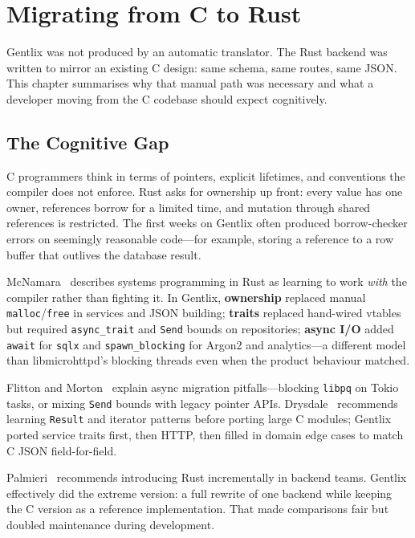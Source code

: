 \chapter{Migrating from C to Rust}
\label{chap:ch7}

\par Gentlix was not produced by an automatic translator. The Rust backend was written 
to mirror an existing C design: same schema, same routes, same JSON. This chapter 
summarises why that manual path was necessary and what a developer moving from the C 
codebase should expect cognitively.

\section{The Cognitive Gap}
\label{sec:ch7sec1}

\par C programmers think in terms of pointers, explicit lifetimes, and conventions 
the compiler does not enforce. Rust asks for ownership up front: every value has one 
owner, references borrow for a limited time, and mutation through shared references 
is restricted. The first weeks on Gentlix often produced borrow-checker errors on 
seemingly reasonable code---for example, storing a reference to a row buffer that 
outlives the database result.

\par McNamara~\cite{McNamara2021} describes systems programming in Rust as learning to 
work \emph{with} the compiler rather than fighting it. In Gentlix, \textbf{ownership} 
replaced manual \texttt{malloc}/\texttt{free} in services and JSON building; 
\textbf{traits} replaced hand-wired vtables but required \texttt{async\_trait} and 
\texttt{Send} bounds on repositories; \textbf{async I/O} added \texttt{await} for 
\texttt{sqlx} and \texttt{spawn\_blocking} for Argon2 and analytics---a different 
model than libmicrohttpd's blocking threads even when the product behaviour matched.

\par Flitton and Morton~\cite{Flitton2023} explain async migration pitfalls---blocking 
\texttt{libpq} on Tokio tasks, or mixing \texttt{Send} bounds with legacy pointer APIs. 
Drysdale~\cite{Drysdale2024} recommends learning \texttt{Result} and iterator patterns 
before porting large C modules; Gentlix ported service traits first, then HTTP, then filled 
in domain edge cases to match C JSON field-for-field.

\par Palmieri~\cite{Palmieri2022} recommends introducing Rust incrementally in backend 
teams. Gentlix effectively did the extreme version: a full rewrite of one backend 
while keeping the C version as a reference implementation. That made comparisons fair 
but doubled maintenance during development.


